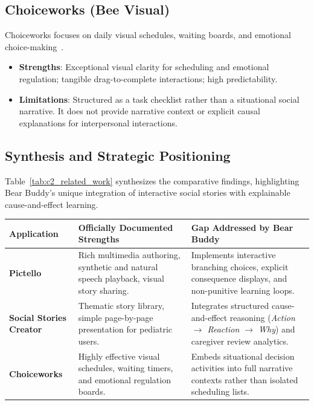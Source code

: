 \subsection{Choiceworks (Bee Visual)}

Choiceworks focuses on daily visual schedules, waiting boards, and emotional choice-making~\cite{choiceworks}.
\begin{itemize}
    \item \textbf{Strengths}: Exceptional visual clarity for scheduling and emotional regulation; tangible drag-to-complete interactions; high predictability.
    \item \textbf{Limitations}: Structured as a task checklist rather than a situational social narrative. It does not provide narrative context or explicit causal explanations for interpersonal interactions.
\end{itemize}

\subsection{Synthesis and Strategic Positioning}

Table~\ref{tab:c2_related_work} synthesizes the comparative findings, highlighting Bear Buddy's unique integration of interactive social stories with explainable cause-and-effect learning.

\begin{xltabular}{\textwidth}{|p{3.2cm}|p{4.5cm}|X|}
\hline
\textbf{Application} & \textbf{Officially Documented Strengths} & \textbf{Gap Addressed by Bear Buddy} \\ \hline
\endhead
\textbf{Pictello} & Rich multimedia authoring, synthetic and natural speech playback, visual story sharing. & Implements interactive branching choices, explicit consequence displays, and non-punitive learning loops. \\ \hline
\textbf{Social Stories Creator} & Thematic story library, simple page-by-page presentation for pediatric users. & Integrates structured cause-and-effect reasoning (\textit{Action $\rightarrow$ Reaction $\rightarrow$ Why}) and caregiver review analytics. \\ \hline
\textbf{Choiceworks} & Highly effective visual schedules, waiting timers, and emotional regulation boards. & Embeds situational decision activities into full narrative contexts rather than isolated scheduling lists. \\ \hline
\end{xltabular}
\label{tab:c2_related_work}

